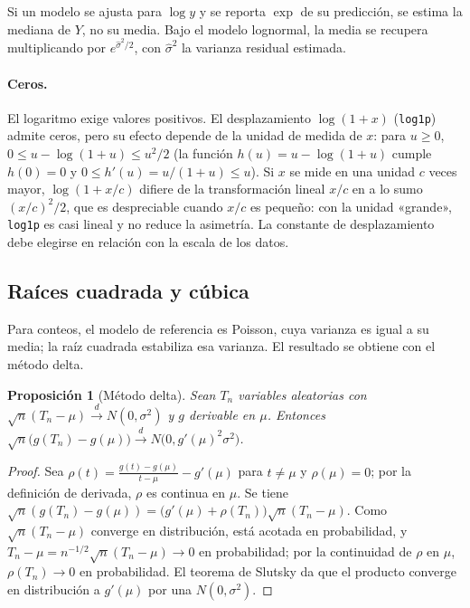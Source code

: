 \documentclass[11pt,a4paper]{article}
\theoremstyle{plain}
\newtheorem{proposicion}[teorema]{Proposición}
\theoremstyle{definition}
\theoremstyle{remark}
\newcommand{\1}{\mathbf{1}}
\begin{document}
Si un modelo se ajusta para $\log y$ y se reporta $\exp$ de su predicción,
se estima la mediana de $Y$, no su media. Bajo el modelo lognormal, la
media se recupera multiplicando por $e^{\hat\sigma^2/2}$, con $\hat\sigma^2$
la varianza residual estimada.

\paragraph{Ceros.} El logaritmo exige valores positivos. El
desplazamiento $\log(1+x)$ (\texttt{log1p}) admite ceros, pero su efecto
depende de la unidad de medida de $x$: para $u\ge0$,
$0\le u-\log(1+u)\le u^2/2$ (la función $h(u)=u-\log(1+u)$ cumple
$h(0)=0$ y $0\le h'(u)=u/(1+u)\le u$). Si $x$ se mide en una unidad
$c$ veces mayor, $\log(1+x/c)$ difiere de la transformación lineal $x/c$
en a lo sumo $(x/c)^2/2$, que es despreciable cuando $x/c$ es pequeño:
con la unidad «grande», \texttt{log1p} es casi lineal y no reduce la
asimetría. La constante de desplazamiento debe elegirse en relación con la
escala de los datos.

\subsection{Raíces cuadrada y cúbica}\label{sec:raiz}

Para conteos, el modelo de referencia es Poisson, cuya varianza es igual a
su media; la raíz cuadrada estabiliza esa varianza. El resultado se
obtiene con el método delta.

\begin{proposicion}[Método delta]\label{prop:delta}
Sean $T_n$ variables aleatorias con
$\sqrt n(T_n-\mu)\xrightarrow{d}N(0,\sigma^2)$ y $g$ derivable en $\mu$.
Entonces
$\sqrt n\bigl(g(T_n)-g(\mu)\bigr)\xrightarrow{d}N\bigl(0,g'(\mu)^2\sigma^2\bigr)$.
\end{proposicion}

\begin{proof}
Sea $\rho(t)=\frac{g(t)-g(\mu)}{t-\mu}-g'(\mu)$ para $t\ne\mu$ y
$\rho(\mu)=0$; por la definición de derivada, $\rho$ es continua en $\mu$.
Se tiene
$\sqrt n(g(T_n)-g(\mu))=\bigl(g'(\mu)+\rho(T_n)\bigr)\sqrt n(T_n-\mu)$.
Como $\sqrt n(T_n-\mu)$ converge en distribución, está acotada en
probabilidad, y $T_n-\mu=n^{-1/2}\sqrt n(T_n-\mu)\to0$ en probabilidad;
por la continuidad de $\rho$ en $\mu$, $\rho(T_n)\to0$ en probabilidad. El
teorema de Slutsky da que el producto converge en distribución a
$g'(\mu)$ por una $N(0,\sigma^2)$.
\end{proof}
\end{document}
